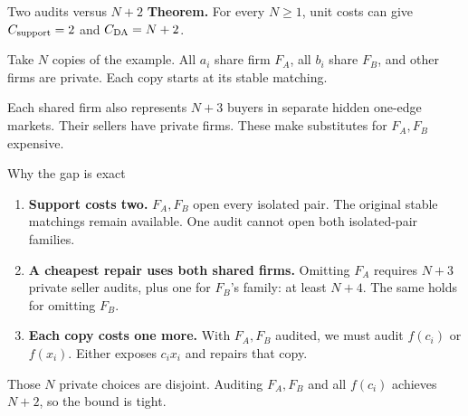 \begin{frame}[t,label=gap]{Two audits versus $N+2$}
\small
\textbf{Theorem.} For every $N\geq1$, unit costs can give
$C_{\mathrm{support}}=2$ and $C_{\mathrm{DA}}=N+2$.

Take $N$ copies of the example. All $a_i$ share firm $F_A$, all $b_i$
share $F_B$, and other firms are private. Each copy starts at its stable matching.
\begin{center}
\end{center}
Each shared firm also represents $N+3$ buyers in separate hidden one-edge
markets. Their sellers have private firms. These make substitutes for $F_A,F_B$ expensive.
\end{frame}

\begin{frame}[t,label=gap-proof]{Why the gap is exact}
\small
\begin{enumerate}
\setlength{\itemsep}{6pt}
\item \textbf{Support costs two.} $F_A,F_B$ open every isolated pair.
The original stable matchings remain available. One audit cannot open
both isolated-pair families.
\item \textbf{A cheapest repair uses both shared firms.} Omitting $F_A$
requires $N+3$ private seller audits, plus one for $F_B$'s family:
at least $N+4$. The same holds for omitting $F_B$.
\item \textbf{Each copy costs one more.} With $F_A,F_B$ audited,
we must audit $f(c_i)$ or $f(x_i)$. Either exposes $c_ix_i$ and repairs that copy.
\end{enumerate}
Those $N$ private choices are disjoint. Auditing $F_A,F_B$ and all $f(c_i)$
achieves $N+2$, so the bound is tight.
\end{frame}

